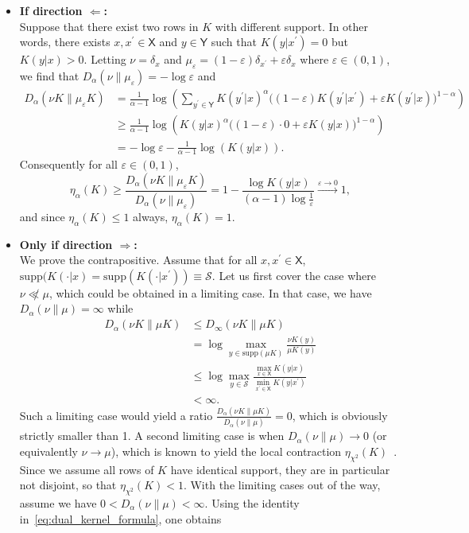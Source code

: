 \documentclass[conference,letterpaper]{IEEEtran}
\def \X{\mathsf X}
\def \Y{\mathsf Y}
\def \calS{\mathcal S}
\def \supp {\mathrm{supp}}
\newcommand{\renyiDiv}[2]{D_{\alpha}\left(#1\|#2\right)}
\begin{document}
    \begin{itemize}
        \item \textbf{If direction $\Longleftarrow$:}\\Suppose that there exist two rows in $K$ with different support. In other words, there exists $x, x^\prime\in\X$ and $y\in\Y$ such that $K(y|x^\prime)=0$ but $K(y|x)>0$. Letting $\nu = \delta_x$ and $\mu_\varepsilon = (1-\varepsilon)\delta_{x^\prime}+\varepsilon\delta_x$ where $\varepsilon\in(0,1)$, we find that $\renyiDiv{\nu}{\mu_\varepsilon}=-\log\varepsilon$ and
        \begin{align*}
            \renyiDiv{\nu K}{\mu_\varepsilon K} &= \frac1{\alpha-1}\log\left(\sum_{y^\prime\in\Y}K (y^\prime|x)^\alpha\big((1-\varepsilon)K(y^\prime|x^\prime) +\varepsilon K(y^\prime|x)\big)^{1-\alpha}\right)\\
            &\geq \frac1{\alpha-1}\log\left(K (y|x)^\alpha\big((1-\varepsilon)\cdot 0 +\varepsilon K(y|x)\big)^{1-\alpha}\right)\\
            &= -\log\varepsilon -\frac1{\alpha-1}\log(K(y|x)).
        \end{align*}
        Consequently for all $\varepsilon\in(0,1)$,
        \begin{equation*}
            \eta_\alpha(K) \geq \frac{\renyiDiv{\nu K}{\mu_\varepsilon K}}{\renyiDiv{\nu}{\mu_\varepsilon}}= 1 -\frac{\log K(y|x)}{(\alpha-1)\log\frac1\varepsilon} \overset{\varepsilon\to 0}{\longrightarrow} 1,
        \end{equation*}
        and since $\eta_\alpha(K)\leq 1$ always, $\eta_\alpha(K)=1$.
        \item \textbf{Only if direction $\Longrightarrow$:}\\We prove the contrapositive. Assume that for all $x, x^\prime\in\X$, $\supp(K(\cdot|x)=\supp(K(\cdot|x^\prime))\equiv \calS$. Let us first cover the case where $\nu\not\ll\mu$, which could be obtained in a limiting case. In that case, we have $\renyiDiv{\nu}{\mu}=\infty$ while 
        \begin{align*}
            \renyiDiv{\nu K}{\mu K}&\leq D_\infty(\nu K\|\mu K) \\
            &= \log\max_{y\in\supp(\mu K)}\frac{\nu K(y)}{\mu K (y)}\\
            &\leq \log\max_{y\in\calS}\frac{\max_{x\in\X}K(y|x)}{\min_{x^\prime\in\X}K(y|x^\prime)} \\
            &<\infty.
        \end{align*}
        Such a limiting case would yield a ratio $\frac{\renyiDiv{\nu K}{\mu K}}{\renyiDiv{\nu}{\mu}} = 0$, which is obviously strictly smaller than 1. A second limiting case is when $\renyiDiv{\nu}{\mu}\to0$ (or equivalently $\nu\to \mu$), which is known to yield the local contraction $\eta_{\chi^2}(K)$~\cite[Theorem 2]{jin2024properties}. Since we assume all rows of $K$ have identical support, they are in particular not disjoint, so that $\eta_{\chi^2}(K)<1$. With the limiting cases out of the way, assume we have $0<\renyiDiv{\nu}{\mu}<\infty$. Using the identity in~\cref{eq:dual_kernel_formula}, one obtains

\end{itemize}
\end{document}
